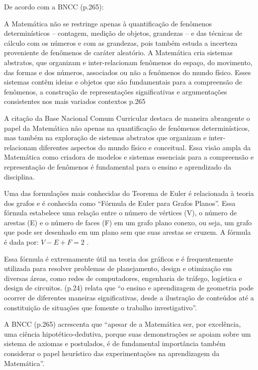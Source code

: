 De acordo com a BNCC \cite{Educacao.2018} (p.265):

\begin{citacao}
    A Matemática não se restringe apenas à quantificação de fenômenos determinísticos – contagem, medição de objetos, grandezas – e das técnicas de cálculo com os números e com as grandezas, pois também estuda a incerteza proveniente de fenômenos de caráter aleatório. A Matemática cria sistemas abstratos, que organizam e inter-relacionam fenômenos do espaço, do movimento, das formas e dos números, associados ou não a fenômenos do mundo físico. Esses sistemas contêm ideias e objetos que são fundamentais para a compreensão de fenômenos, a construção de representações significativas e argumentações consistentes nos mais variados contextos \cite{Educacao.2018} p.265
\end{citacao}

A citação da Base Nacional Comum Curricular destaca de maneira abrangente o papel da Matemática não apenas na quantificação de fenômenos determinísticos, mas também na exploração de sistemas abstratos que organizam e inter-relacionam diferentes aspectos do mundo físico e conceitual. Essa visão ampla da Matemática como criadora de modelos e sistemas essenciais para a compreensão e representação de fenômenos é fundamental para o ensino e aprendizado da disciplina.

Uma das formulações mais conhecidas do Teorema de Euler é relacionada à teoria dos grafos e é conhecida como ``Fórmula de Euler para Grafos Planos''. Essa fórmula estabelece uma relação entre o número de vértices (V), o número de arestas (E) e o número de faces (F) em um grafo plano conexo, ou seja, um grafo que pode ser desenhado em um plano sem que suas arestas se cruzem. A fórmula é dada por: $V - E + F = 2$ \cite{Siqueira2009}.

Essa fórmula é extremamente útil na teoria dos gráficos e é frequentemente utilizada para resolver problemas de planejamento, design e otimização em diversas áreas, como redes de computadores, engenharia de tráfego, logística e design de circuitos.  (p.24) relata que ``o ensino e aprendizagem de geometria pode ocorrer de diferentes maneiras significativas, desde a ilustração de conteúdos até a constituição de situações que fomente o trabalho investigativo''.

A BNCC \cite{Educacao.2018} (p.265) acrescenta que ``apesar de a Matemática ser, por excelência, uma ciência hipotético-dedutiva, porque suas demonstrações se apoiam sobre um sistema de axiomas e postulados, é de fundamental importância também considerar o papel heurístico das experimentações na aprendizagem da Matemática''.

